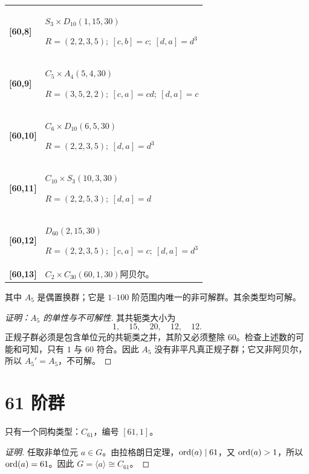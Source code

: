 \documentclass[UTF8,fontset=fandol,11pt,a4paper]{ctexart}
\begin{document}
\begin{longtable}{@{}p{17mm}>{\raggedright\arraybackslash}p{141mm}@{}}
\textbf{[60,8]} & $S_{3}\times D_{10}$\quad $(1,15,30)$\par\(R=(2,2,3,5);\allowbreak\ [c,b]=c;\allowbreak\ [d,a]=d^{3}\)\\[3pt]

\textbf{[60,9]} & $C_{5}\times A_{4}$\quad $(5,4,30)$\par\(R=(3,5,2,2);\allowbreak\ [c,a]=cd;\allowbreak\ [d,a]=c\)\\[3pt]

\textbf{[60,10]} & $C_{6}\times D_{10}$\quad $(6,5,30)$\par\(R=(2,2,3,5);\allowbreak\ [d,a]=d^{3}\)\\[3pt]

\textbf{[60,11]} & $C_{10}\times S_{3}$\quad $(10,3,30)$\par\(R=(2,2,5,3);\allowbreak\ [d,a]=d\)\\[3pt]

\textbf{[60,12]} & $D_{60}$\quad $(2,15,30)$\par\(R=(2,2,3,5);\allowbreak\ [c,a]=c;\allowbreak\ [d,a]=d^{3}\)\\[3pt]

\textbf{[60,13]} & $C_{2}\times C_{30}$\quad $(60,1,30)$\quad 阿贝尔。\\[3pt]

\end{longtable}\endgroup

其中 $A_5$ 是偶置换群；它是 $1$--$100$ 阶范围内唯一的非可解群。其余类型均可解。

\begin{proof}[证明：$A_5$ 的单性与不可解性]
其共轭类大小为
\[
1,\quad15,\quad20,\quad12,\quad12.
\]
正规子群必须是包含单位元的共轭类之并，其阶又必须整除 $60$。检查上述数的可能和可知，只有 $1$ 与 $60$ 符合。因此 $A_5$ 没有非平凡真正规子群；它又非阿贝尔，所以 $A_5'=A_5$，不可解。
\end{proof}

\section*{61 阶群}\label{order:61}

只有一个同构类型：$C_{61}$，编号 $[61,1]$。

\begin{proof}[证明]
任取非单位元 $a\in G$。由拉格朗日定理，$\operatorname{ord}(a)\mid 61$，又 $\operatorname{ord}(a)>1$，所以 $\operatorname{ord}(a)=61$。因此 $G=\langle a\rangle\cong C_{61}$。
\end{proof}
\end{document}
